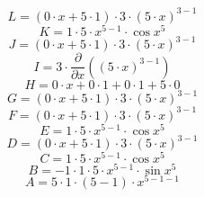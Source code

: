 \documentclass[12pt]{article}
\begin{document}
\begin{equation}
	L = 
\left( 0\cdot x + 5\cdot 1\right) \cdot 3\cdot \left( 5\cdot x\right) ^{3 - 1}
\end{equation}
\begin{equation}
	K = 
1\cdot 5\cdot x^{5 - 1}\cdot \cos {x^{5}}
\end{equation}
\begin{equation}
	J = 
\left( 0\cdot x + 5\cdot 1\right) \cdot 3\cdot \left( 5\cdot x\right) ^{3 - 1}
\end{equation}
\begin{equation}
	I = 
3\cdot \frac{\partial}{\partial x}\left( \left( 5\cdot x\right) ^{3 - 1}\right) 
\end{equation}
\begin{equation}
	H = 
0\cdot x + 0\cdot 1 + 0\cdot 1 + 5\cdot 0
\end{equation}
\begin{equation}
	G = 
\left( 0\cdot x + 5\cdot 1\right) \cdot 3\cdot \left( 5\cdot x\right) ^{3 - 1}
\end{equation}
\begin{equation}
	F = 
\left( 0\cdot x + 5\cdot 1\right) \cdot 3\cdot \left( 5\cdot x\right) ^{3 - 1}
\end{equation}
\begin{equation}
	E = 
1\cdot 5\cdot x^{5 - 1}\cdot \cos {x^{5}}
\end{equation}
\begin{equation}
	D = 
\left( 0\cdot x + 5\cdot 1\right) \cdot 3\cdot \left( 5\cdot x\right) ^{3 - 1}
\end{equation}
\begin{equation}
	C = 
1\cdot 5\cdot x^{5 - 1}\cdot \cos {x^{5}}
\end{equation}
\begin{equation}
	B = 
-1\cdot 1\cdot 5\cdot x^{5 - 1}\cdot \sin {x^{5}}
\end{equation}
\begin{equation}
	A = 
5\cdot 1\cdot \left( 5 - 1\right) \cdot x^{5 - 1 - 1}
\end{equation}
\end{document}
